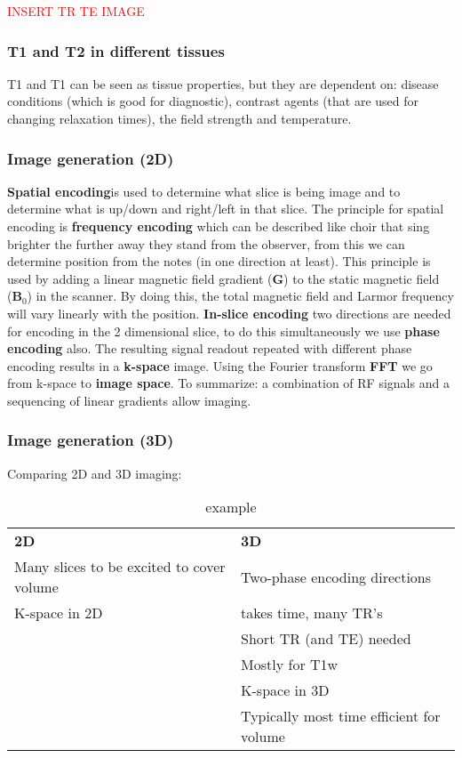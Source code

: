 		\textcolor{red}{INSERT TR TE IMAGE} 
		
		\subsubsection{T1 and T2 in different tissues}
		T1 and T1 can be seen as tissue properties, but they are dependent on: disease conditions (which is good for diagnostic), contrast agents (that are used for changing relaxation times), the field strength and temperature.

		\subsubsection{Image generation (2D)}
		\textbf{Spatial encoding}is used to determine what slice is being image and to determine what is up/down and right/left in that slice. The principle for spatial encoding is \textbf{frequency encoding} which can be described like choir that sing brighter the further away they stand from the observer, from this we can determine position from the notes (in one direction at least). This principle is used by adding a linear magnetic field gradient (\textbf{G}) to the static magnetic field (\textbf{B}$_0$) in the scanner. By doing this, the total magnetic field and Larmor frequency will vary linearly with the position.
		\textbf{In-slice encoding} two directions are needed for encoding in the 2 dimensional slice, to do this simultaneously we use \textbf{phase encoding} also. The resulting signal readout repeated with different phase encoding results in a \textbf{k-space} image. Using the Fourier transform \textbf{FFT} we go from k-space to \textbf{image space}. To summarize: a combination of RF signals and a sequencing of linear gradients allow imaging.  
		
		\subsubsection{Image generation (3D)}
		Comparing 2D and 3D imaging:

			\begin{table}[ht!]
			\centering
			\begin{tabular}{ll}\hline
			 \textbf{2D}&   \textbf{3D} \\
			 Many slices to be excited to cover volume&  Two-phase encoding directions  \\
			 K-space in 2D& takes time, many TR's  \\
			 &  Short TR (and TE) needed \\
			 & Mostly for T1w   \\
			 & K-space in 3D \\
			 & Typically most time efficient for volume \\ \hline
			\end{tabular}
			\caption{example}
			\label{tab:tab1}
			\end{table}

